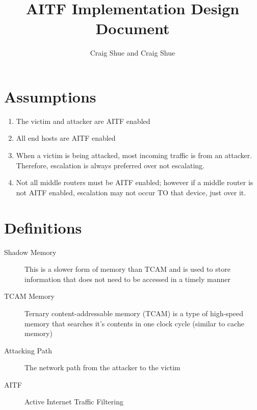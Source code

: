\documentclass[11pt]{article}
\title{\textbf{AITF Implementation Design Document}}
\author{Craig Shue and Craig Shue}
\date{}
\begin{document}
\maketitle


\section{Assumptions}
\begin{enumerate}
	\item The victim and attacker are AITF enabled
	\item All end hosts are AITF enabled
	\item When a victim is being attacked, most incoming traffic is from an
	attacker. Therefore, escalation is always preferred over not escalating.
	\item Not all middle routers must be AITF enabled; however if a middle
	router is not AITF enabled, escalation may not occur TO that device,
	just over it.
\end{enumerate}

\section{Definitions}
\begin{description}
	\item[Shadow Memory] This is a slower form of memory than TCAM and is used
	to store information that does not need to be accessed in a timely manner
	\item[TCAM Memory] Ternary content-addressable memory (TCAM) is a type of
	high-speed memory that searches it’s contents in one clock cycle
	(similar to cache memory)
	\item[Attacking Path] The network path from the attacker to the victim
	\item[AITF] Active Internet Traffic Filtering
\end{description}
\end{document}
